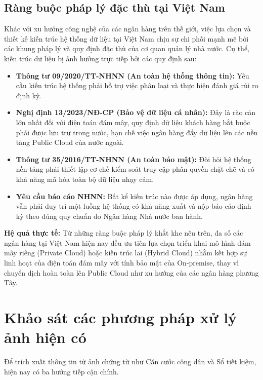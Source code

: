 \subsection{Ràng buộc pháp lý đặc thù tại Việt Nam}

Khác với xu hướng công nghệ của các ngân hàng trên thế giới, việc lựa chọn và thiết kế kiến trúc hệ thống dữ liệu tại Việt Nam chịu sự chi phối mạnh mẽ bởi các khung pháp lý và quy định đặc thù của cơ quan quản lý nhà nước. Cụ thể, kiến trúc dữ liệu bị ảnh hưởng trực tiếp bởi các quy định sau:

\begin{itemize}
    \item \textbf{Thông tư 09/2020/TT-NHNN (An toàn hệ thống thông tin):} Yêu cầu kiến trúc hệ thống phải hỗ trợ việc phân loại và thực hiện đánh giá rủi ro định kỳ.
    \item \textbf{Nghị định 13/2023/NĐ-CP (Bảo vệ dữ liệu cá nhân):} Đây là rào cản lớn nhất đối với điện toán đám mây, quy định dữ liệu khách hàng bắt buộc phải được lưu trữ trong nước, hạn chế việc ngân hàng đẩy dữ liệu lên các nền tảng Public Cloud của nước ngoài.
    \item \textbf{Thông tư 35/2016/TT-NHNN (An toàn bảo mật):} Đòi hỏi hệ thống nền tảng phải thiết lập cơ chế kiểm soát truy cập phân quyền chặt chẽ và có khả năng mã hóa toàn bộ dữ liệu nhạy cảm.
    \item \textbf{Yêu cầu báo cáo NHNN:} Bất kể kiến trúc nào được áp dụng, ngân hàng vẫn phải duy trì một luồng hệ thống có khả năng xuất và nộp báo cáo định kỳ theo đúng quy chuẩn do Ngân hàng Nhà nước ban hành.
\end{itemize}

\textbf{Hệ quả thực tế:} Từ những ràng buộc pháp lý khắt khe nêu trên, đa số các ngân hàng tại Việt Nam hiện nay đều ưu tiên lựa chọn triển khai mô hình đám mây riêng (Private Cloud) hoặc kiến trúc lai (Hybrid Cloud) nhằm kết hợp sự linh hoạt của điện toán đám mây với tính bảo mật của On-premise, thay vì chuyển dịch hoàn toàn lên Public Cloud như xu hướng của các ngân hàng phương Tây.

\section{Khảo sát các phương pháp xử lý ảnh hiện có}
Để trích xuất thông tin từ ảnh chứng từ như Căn cước công dân và Sổ tiết kiệm, hiện nay có ba hướng tiếp cận chính.

